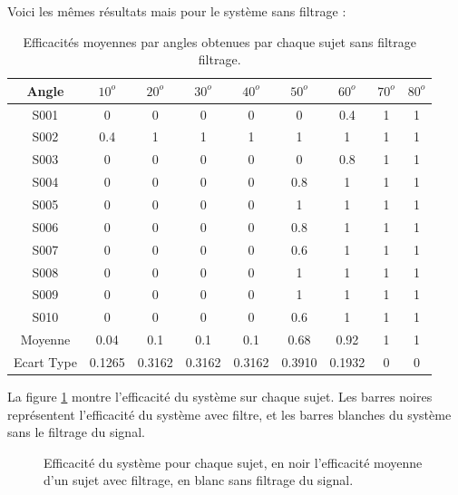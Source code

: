 \documentclass[letterpaper, twoside, 12pt, memoire, creativecommons, hyperref]{thETS}
\begin{document}
Voici les mêmes résultats mais pour le système sans filtrage :

\begin{table}[ht]
	\caption{Efficacités moyennes par angles obtenues par chaque sujet sans filtrage filtrage. }
		\begin{tabular}{|c|c|c|c|c|c|c|c|c|}
		\hline
			Angle & $10^{o}$ & $20^{o}$ & $30^{o}$ & $40^{o}$ & $50^{o}$ & $60^{o}$ & $70^{o}$ & $80^{o}$\\
	    \hline
	    		S001 & 0 & 0 & 0 & 0 & 0 & 0.4 & 1 & 1\\
	    \hline
			S002 & 0.4 & 1 & 1 & 1 & 1 & 1 & 1 & 1\\
	    \hline
	    		S003 & 0 & 0 & 0 & 0 & 0 & 0.8 & 1 & 1\\
	    \hline
	    		S004 & 0 & 0 & 0 & 0 & 0.8 & 1 & 1 & 1\\
	    \hline
	    		S005 & 0 & 0 & 0 & 0 & 1 & 1 & 1 & 1\\
	    \hline
	    		S006 & 0 & 0 & 0 & 0 & 0.8 & 1 & 1 & 1\\
	    \hline
	    		S007 & 0 & 0 & 0 & 0 & 0.6 & 1 & 1 & 1\\
	    \hline
	    		S008 & 0 & 0 & 0 & 0 & 1 & 1 & 1 & 1\\
	    \hline
	    		S009 & 0 & 0 & 0 & 0 & 1 & 1 & 1 & 1\\
	    \hline
	    		S010 & 0 & 0 & 0 & 0 & 0.6 & 1 & 1 & 1\\
	    \hline
	    		Moyenne & 0.04 & 0.1 & 0.1 & 0.1 & 0.68 & 0.92 & 1 & 1\\
	    \hline
	    		Ecart Type & 0.1265 & 0.3162 & 0.3162 & 0.3162 & 0.3910 & 0.1932 & 0 & 0\\
	    \hline
		\end{tabular}
	\label{tab:effFangles}
\end{table}

La figure \ref{fig:effsujets} montre l'efficacité du système sur chaque sujet. Les barres noires représentent l'efficacité du système avec filtre, et les barres blanches du système sans le filtrage du signal. 

\begin{figure}
	\centering
	\caption{Efficacité du système pour chaque sujet, en noir l'efficacité moyenne d'un sujet avec filtrage, en blanc sans filtrage du signal.}
	\label{fig:effsujets}
\end{figure}
\end{document}

